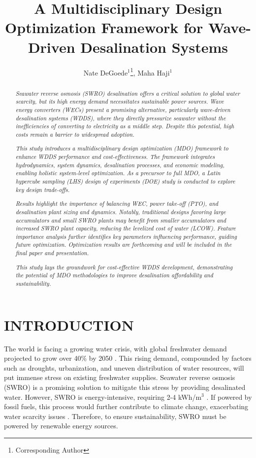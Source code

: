 \documentclass[twocolumn,10pt]{asme2e}
\title{ \vspace{-10 mm} A Multidisciplinary Design Optimization Framework for Wave-Driven Desalination Systems}
\author{Nate DeGoede$^1$\thanks{Corresponding Author}, Maha Haji$^1$
    \affiliation{
	$^1$Sibley School of Mechanical and Aerospace Engineering\\
	Cornell University\\
	Ithaca, New York 14853\\
    Email: \{njd76, maha\}@cornell.edu 
    }
}
\begin{document}
\maketitle

\setlength{\abovedisplayskip}{10pt}
\setlength{\belowdisplayskip}{10pt}

\begin{abstract}

\textit{Seawater reverse osmosis (SWRO) desalination offers a critical solution to global water scarcity, but its high energy demand necessitates sustainable power sources. Wave energy converters (WECs) present a promising alternative, particularly wave-driven desalination systems (WDDS), where they directly pressurize seawater without the inefficiencies of converting to electricity as a middle step. Despite this potential, high costs remain a barrier to widespread adoption.} 

\textit{This study introduces a multidisciplinary design optimization (MDO) framework to enhance WDDS performance and cost-effectiveness. The framework integrates hydrodynamics, system dynamics, desalination processes, and economic modeling, enabling holistic system-level optimization.  As a precursor to full MDO, a Latin hypercube sampling (LHS) design of experiments (DOE) study is conducted to explore key design trade-offs.} 

\textit{Results highlight the importance of balancing WEC, power take-off (PTO), and desalination plant sizing and dynamics. Notably, traditional designs favoring large accumulators and small SWRO plants may benefit from smaller accumulators and increased SWRO plant capacity, reducing the levelized cost of water (LCOW). Feature importance analysis further identifies key parameters influencing performance, guiding future optimization. Optimization results are forthcoming and will be included in the final paper and presentation.}

\textit{This study lays the groundwork for cost-effective WDDS development, demonstrating the potential of MDO methodologies to improve desalination affordability and sustainability.}

\end{abstract}


\section{INTRODUCTION}

The world is facing a growing water crisis, with global freshwater demand projected to grow over 40\% by 2050 \cite{watershortage2015}. This rising demand, compounded by factors such as droughts, urbanization, and uneven distribution of water resources, will put immense stress on existing freshwater supplies. Seawater reverse osmosis (SWRO) is a promising solution to mitigate this stress by providing desalinated water. However, SWRO is energy-intensive, requiring 2-4 kWh/m$^3$ \cite{Li2018}. If powered by fossil fuels, this process would further contribute to climate change, exacerbating water scarcity issues \cite{nytdrought}. Therefore, to ensure sustainability, SWRO must be powered by renewable energy sources. 
\end{document}
